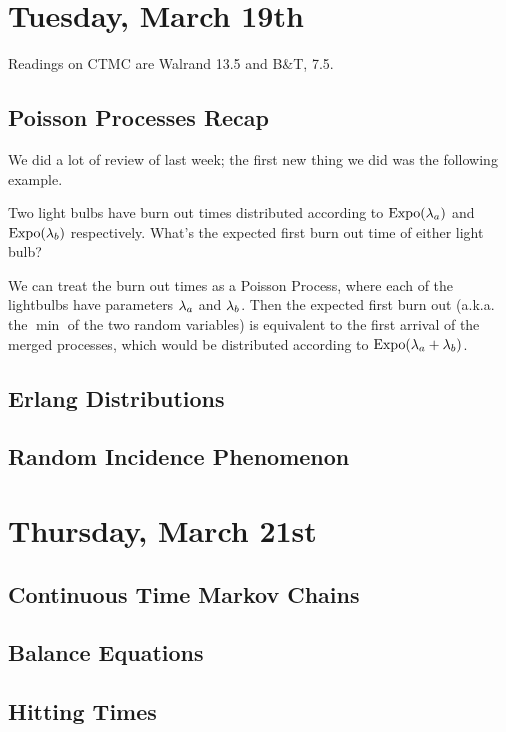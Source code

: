\documentclass[11 pt]{scrartcl}
\begin{document}
\newpage
\section{Tuesday, March 19th}
Readings on CTMC are Walrand 13.5 and B\&T, 7.5. 

\subsection{Poisson Processes Recap}
We did a lot of review of last week; the first new thing we did was the following example. 

\begin{example}
    Two light bulbs have burn out times distributed according to $\text{Expo}(\lambda_a)$ and $\text{Expo}(\lambda_b)$ respectively. What's the expected first burn out time of either light bulb? 
\end{example}

We can treat the burn out times as a Poisson Process, where each of the lightbulbs have  parameters $\lambda_a$ and $\lambda_b$. Then the expected first burn out (a.k.a. the $\min$ of the two random variables) is equivalent to the first arrival of the merged processes, which would be distributed according to $\text{Expo}(\lambda_a+\lambda_b)$. 

\subsection{Erlang Distributions}

\subsection{Random Incidence Phenomenon}
 

\newpage
\section{Thursday, March 21st}

\subsection{Continuous Time Markov Chains}

\subsection{Balance Equations}

\subsection{Hitting Times}
\end{document}
